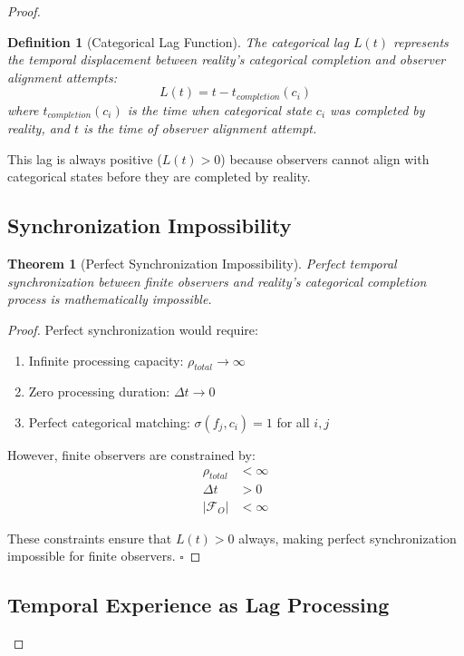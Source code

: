 \documentclass[12pt,a4paper]{article}
\newtheorem{theorem}{Theorem}
\newtheorem{definition}{Definition}
\begin{document}
\begin{proof}
\begin{definition}[Categorical Lag Function]
The categorical lag $L(t)$ represents the temporal displacement between reality's categorical completion and observer alignment attempts:
$$L(t) = t - t_{completion}(c_i)$$
where $t_{completion}(c_i)$ is the time when categorical state $c_i$ was completed by reality, and $t$ is the time of observer alignment attempt.
\end{definition}

This lag is always positive ($L(t) > 0$) because observers cannot align with categorical states before they are completed by reality.

\subsection{Synchronization Impossibility}

\begin{theorem}[Perfect Synchronization Impossibility]
Perfect temporal synchronization between finite observers and reality's categorical completion process is mathematically impossible.
\end{theorem}

\begin{proof}
Perfect synchronization would require:
\begin{enumerate}
\item Infinite processing capacity: $\rho_{total} \rightarrow \infty$
\item Zero processing duration: $\Delta t \rightarrow 0$
\item Perfect categorical matching: $\sigma(f_j, c_i) = 1$ for all $i,j$
\end{enumerate}

However, finite observers are constrained by:
\begin{align}
\rho_{total} &< \infty \\
\Delta t &> 0 \\
|\mathcal{F}_O| &< \infty
\end{align}

These constraints ensure that $L(t) > 0$ always, making perfect synchronization impossible for finite observers. $\square$
\end{proof}

\subsection{Temporal Experience as Lag Processing}


\end{proof}
\end{document}
